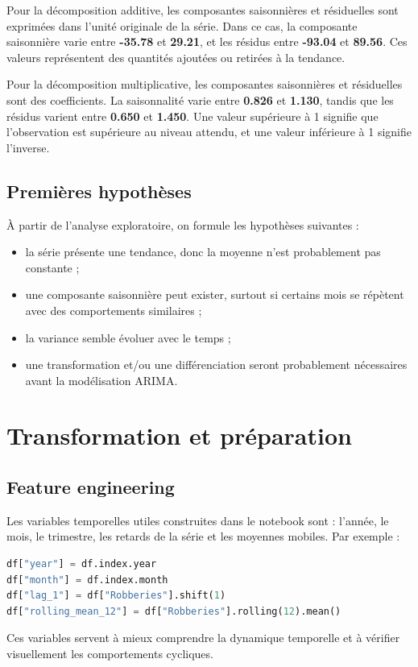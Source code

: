 \documentclass[12pt,a4paper]{report}
\begin{document}
Pour la décomposition additive, les composantes saisonnières et résiduelles sont exprimées dans l'unité originale de la série. Dans ce cas, la composante saisonnière varie entre \textbf{-35.78} et \textbf{29.21}, et les résidus entre \textbf{-93.04} et \textbf{89.56}. Ces valeurs représentent des quantités ajoutées ou retirées à la tendance.

Pour la décomposition multiplicative, les composantes saisonnières et résiduelles sont des coefficients. La saisonnalité varie entre \textbf{0.826} et \textbf{1.130}, tandis que les résidus varient entre \textbf{0.650} et \textbf{1.450}. Une valeur supérieure à 1 signifie que l'observation est supérieure au niveau attendu, et une valeur inférieure à 1 signifie l'inverse.

\section{Premières hypothèses}
À partir de l'analyse exploratoire, on formule les hypothèses suivantes :
\begin{itemize}
    \item la série présente une tendance, donc la moyenne n'est probablement pas constante ;
    \item une composante saisonnière peut exister, surtout si certains mois se répètent avec des comportements similaires ;
    \item la variance semble évoluer avec le temps ;
    \item une transformation et/ou une différenciation seront probablement nécessaires avant la modélisation ARIMA.
\end{itemize}

\chapter{Transformation et préparation}
\section{Feature engineering}
Les variables temporelles utiles construites dans le notebook sont : l'année, le mois, le trimestre, les retards de la série et les moyennes mobiles. Par exemple :
\begin{lstlisting}[language=Python]
df["year"] = df.index.year
df["month"] = df.index.month
df["lag_1"] = df["Robberies"].shift(1)
df["rolling_mean_12"] = df["Robberies"].rolling(12).mean()
\end{lstlisting}
Ces variables servent à mieux comprendre la dynamique temporelle et à vérifier visuellement les comportements cycliques.
\end{document}
